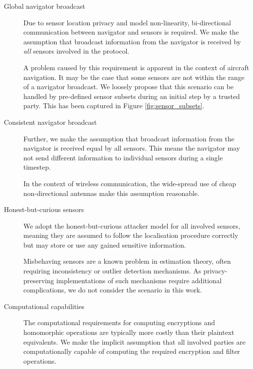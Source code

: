 \documentclass[twocolumn]{autart}
\begin{document}
\begin{description}
    \item[Global navigator broadcast] Due to sensor location privacy and model non-linearity, bi-directional communication between navigator and sensors is required. We make the assumption that broadcast information from the navigator is received by \textit{all} sensors involved in the protocol.
    
    A problem caused by this requirement is apparent in the context of aircraft navigation. It may be the case that some sensors are not within the range of a navigator broadcast. We loosely propose that this scenario can be handled by pre-defined sensor subsets during an initial step by a trusted party. This has been captured in Figure \ref{fig:sensor_subsets}.
    \item[Consistent navigator broadcast] Further, we make the assumption that broadcast information from the navigator is received equal by all sensors. This means the navigator may not send different information to individual sensors during a single timestep.
    
    In the context of wireless communication, the wide-spread use of cheap non-directional antennas make this assumption reasonable.
    \item[Honest-but-curious sensors] We adopt the honest-but-curious attacker model for all involved sensors, meaning they are assumed to follow the localisation procedure correctly but may store or use any gained sensitive information. 
    
    Misbehaving sensors are a known problem in estimation theory, often requiring inconsistency or outlier detection mechanisms. As privacy-preserving implementations of such mechanisms require additional complications, we do not consider the scenario in this work.
    \item[Computational capabilities] The computational requirements for computing encryptions and homomorphic operations are typically more costly than their plaintext equivalents. We make the implicit assumption that all involved parties are computationally capable of computing the required encryption and filter operations.
\end{description}
\end{document}
